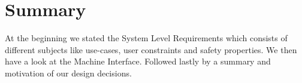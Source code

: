 \section{Summary}
At the beginning we stated the System Level Requirements which consists of different subjects like use-cases, user constraints and safety properties. We then have a look at the Machine Interface. Followed lastly by a summary and motivation of our design decisions.
\begin{comment}
Machine Design
    - SLR
        - Requirements
        - Use-cases
        - User constraints
        - Safety Properties
Design decisions
\end{comment}